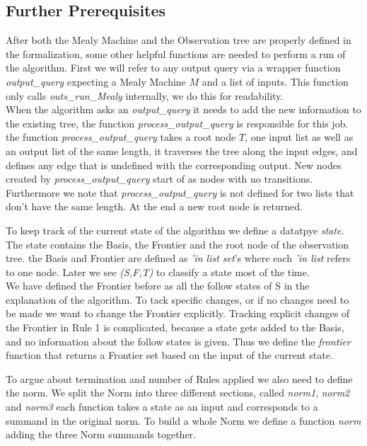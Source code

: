 \subsection{Further Prerequisites}
After both the Mealy Machine and the Observation tree are properly defined in the formalization, some other helpful functions are needed to perform a run of the algorithm. First we will refer to any output query via a wrapper function \textit{output\_query} expecting a Mealy Machine $M$ and a list of inputs. This function only calls \textit{outs\_run\_Mealy} internally, we do this for readability. \\
When the algorithm asks an \textit{output\_query} it needs to add the new information to the existing tree, the function \textit{process\_output\_query} is responsible for this job. the function \textit{process\_output\_query} takes a root node $T$, one input list as well as an output list of the same length, it traverses the tree along the input edges, and defines any edge that is undefined with the corresponding output. New nodes created by \textit{process\_output\_query} start of as nodes with no transitions. Furthermore we note that \textit{process\_output\_query} is not defined for two lists that don't have the same length. At the end a new root node is returned. 
\begin{myisabelle}
	\procopquery
\end{myisabelle}
To keep track of the current state of the algorithm we define a datatpye \textit{state}. The state contains the Basis, the Frontier and the root node of the observation tree. the Basis and Frontier are defined as \textit{'in list set}'s where each \textit{'in list} refers to one node. Later we see \textit{(S,F,T)} to classify a state most of the time.\\
We have defined the Frontier before as all the follow states of S in the explanation of the algorithm. To tack specific changes, or if no changes need to be made we want to change the Frontier explicitly. Tracking explicit changes of the Frontier in Rule 1 is complicated, because a state gets added to the Basis, and no information about the follow states is given. Thus we define the \textit{frontier} function that returns a Frontier set based on the input of the current state.
 \begin{myisabelle}
 	\frontier
 \end{myisabelle}
To argue about termination and number of Rules applied we also need to define the norm. We split the Norm into three different sections, called \textit{norm1}, \textit{norm2} and \textit{norm3} each function takes a state as an input and corresponds to a summand in the original norm. To build a whole Norm we define a function \textit{norm} adding the three Norm summands together.\\ 
